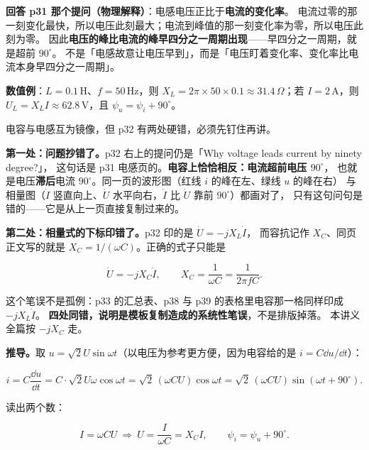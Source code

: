 \documentclass[11pt]{ctexart}
\begin{document}

\textbf{回答 p31 那个提问（物理解释）}：电感电压正比于\textbf{电流的变化率}。
电流过零的那一刻变化最快，所以电压此刻最大；电流到峰值的那一刻变化率为零，所以电压此刻为零。
因此\textbf{电压的峰比电流的峰早四分之一周期出现}——早四分之一周期，就是超前 $90^\circ$。
不是「电感故意让电压早到」，而是「电压盯着变化率、变化率比电流本身早四分之一周期」。

\textbf{数值例}：$L=0.1\,\mathrm{H}$、$f=50\,\mathrm{Hz}$，则
$X_L=2\pi\times50\times0.1\approx31.4\,\Omega$；若 $I=2\,\mathrm{A}$，则
$U_L=X_LI\approx62.8\,\mathrm{V}$，且 $\psi_u=\psi_i+90^\circ$。


电容与电感互为镜像，但 p32 有两处硬错，必须先钉住再讲。

\textbf{第一处：问题抄错了。}p32 右上的提问仍是「Why voltage leads current by ninety degree?」，
这句话是 p31 电感页的。\textbf{电容上恰恰相反：电流超前电压 $90^\circ$}，
也就是电压\textbf{滞后}电流 $90^\circ$。同一页的波形图（红线 $i$ 的峰在左、绿线 $u$ 的峰在右）
与相量图（$\dot I$ 竖直向上、$\dot U$ 水平向右，$\dot I$ 比 $\dot U$ 靠前 $90^\circ$）都画对了，
只有这句问句是错的——它是从上一页直接复制过来的。

\textbf{第二处：相量式的下标印错了。}p32 印的是 $\dot U=-jX_L\dot I$，
而容抗记作 $X_C$、同页正文写的就是 $X_C=1/(\omega C)$。正确的式子只能是

\[ \dot U=-jX_C\dot I ,\qquad X_C=\frac{1}{\omega C}=\frac{1}{2\pi fC} . \]

这个笔误不是孤例：p33 的汇总表、p38 与 p39 的表格里电容那一格同样印成 $-jX_L\dot I$。
\textbf{四处同错，说明是模板复制造成的系统性笔误}，不是排版掉落。
本讲义全篇按 $-jX_C$ 走。

\textbf{推导。}取 $u=\sqrt2U\sin\omega t$（以电压为参考更方便，因为电容给的是 $i=C\dd u/\dd t$）：

\[ i=C\frac{\dd u}{\dd t}=C\cdot\sqrt2U\omega\cos\omega t
   =\sqrt2\,(\omega CU)\cos\omega t=\sqrt2\,(\omega CU)\sin\left(\omega t+90^\circ\right) . \]

读出两个数：

\[ I=\omega CU\ \Longrightarrow\ U=\frac{I}{\omega C}=X_CI ,\qquad
   \psi_i=\psi_u+90^\circ . \]
\end{document}
